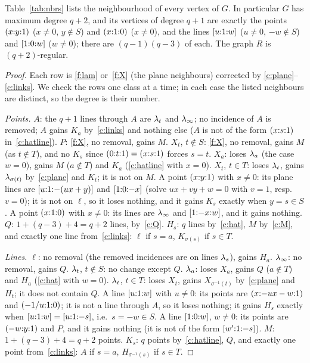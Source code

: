 \begin{lemma}[Degrees]\label{lem:coords-deg}
Table~\ref{tab:nbrs} lists the neighbourhood of every vertex of $G$. In particular $G$ has maximum degree $q+2$, and its vertices of degree $q+1$ are exactly the points $({x}{:}{y}{:}{1})$ \textup{(}$x \ne 0$, $y \notin S$\textup{)} and $({x}{:}{1}{:}{0})$ \textup{(}$x \ne 0$\textup{)}, and the lines $[{u}{:}{1}{:}{w}]$ \textup{(}$u \ne 0$, $-w \notin S$\textup{)} and $[{1}{:}{0}{:}{w}]$ \textup{(}$w \ne 0$\textup{)}; there are $(q-1)(q-3)$ of each. The graph $R$ is $(q+2)$-regular.
\end{lemma}

\begin{proof}
Each row is \ref{f:lam} or~\ref{f:X} (the plane neighbours) corrected by \ref{c:plane}--\ref{c:links}. We check the rows one class at a time; in each case the listed neighbours are distinct, so the degree is their number.

\emph{Points.} $A$: the $q+1$ lines through $A$ are $\lambda_t$ and $\lambda_\infty$; no incidence of $A$ is removed; $A$ gains $K_a$ by~\ref{c:links} and nothing else ($A$ is not of the form $({x}{:}{s}{:}{1})$ in~\ref{c:hatline}). $P$: \ref{f:X}, no removal, gains $M$. $X_t$, $t \notin S$: \ref{f:X}, no removal, gains $M$ (as $t \notin T$), and no $K_s$ since $({0}{:}{t}{:}{1}) = ({x}{:}{s}{:}{1})$ forces $s = t$. $X_a$: loses $\lambda_a$ (the case $w = 0$), gains $M$ ($a \notin T$) and $K_a$ (\ref{c:hatline} with $x=0$). $X_t$, $t \in T$: loses $\lambda_t$, gains $\lambda_{\sigma(t)}$ by~\ref{c:plane} and $K_t$; it is not on $M$. A point $({x}{:}{y}{:}{1})$ with $x \ne 0$: its plane lines are $[{u}{:}{1}{:}{-(ux+y)}]$ and $[{1}{:}{0}{:}{-x}]$ (solve $ux + v y + w = 0$ with $v = 1$, resp.\ $v = 0$); it is not on $\ell$, so it loses nothing, and it gains $K_s$ exactly when $y = s \in S$. A point $({x}{:}{1}{:}{0})$ with $x \ne 0$: its lines are $\lambda_\infty$ and $[{1}{:}{-x}{:}{w}]$, and it gains nothing. $Q$: $1 + (q-3) + 4 = q+2$ lines, by~\ref{c:Q}. $H_s$: $q$ lines by~\ref{c:hat}, $M$ by~\ref{c:M}, and exactly one line from~\ref{c:links}: $\ell$ if $s = a$, $K_{\sigma(s)}$ if $s \in T$.

\emph{Lines.} $\ell$: no removal (the removed incidences are on lines $\lambda_s$), gains $H_a$. $\lambda_\infty$: no removal, gains $Q$. $\lambda_t$, $t \notin S$: no change except $Q$. $\lambda_a$: loses $X_a$, gains $Q$ ($a \notin T$) and $H_a$ (\ref{c:hat} with $w = 0$). $\lambda_t$, $t \in T$: loses $X_t$, gains $X_{\sigma^{-1}(t)}$ by~\ref{c:plane} and $H_t$; it does not contain $Q$. A line $[{u}{:}{1}{:}{w}]$ with $u \neq 0$: its points are $({x}{:}{-ux-w}{:}{1})$ and $({-1/u}{:}{1}{:}{0})$; it is not a line through $A$, so it loses nothing; it gains $H_s$ exactly when $[{u}{:}{1}{:}{w}] = [{u}{:}{1}{:}{-s}]$, i.e.\ $s = -w \in S$. A line $[{1}{:}{0}{:}{w}]$, $w \ne 0$: its points are $({-w}{:}{y}{:}{1})$ and $P$, and it gains nothing (it is not of the form $[{w'}{:}{1}{:}{-s}]$). $M$: $1 + (q-3) + 4 = q+2$ points. $K_s$: $q$ points by~\ref{c:hatline}, $Q$, and exactly one point from~\ref{c:links}: $A$ if $s = a$, $H_{\sigma^{-1}(s)}$ if $s \in T$.


\end{proof}
